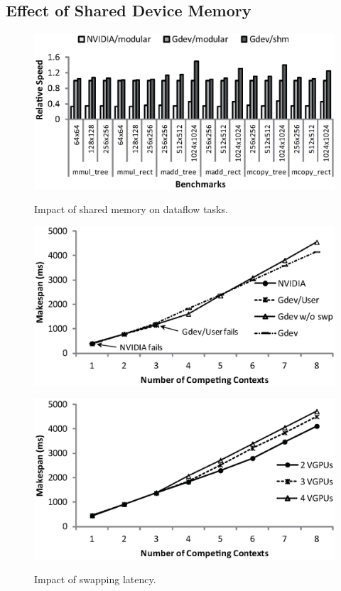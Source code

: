 \vspace{-0.25em}
\subsection{Effect of Shared Device Memory}
\vspace{-0.25em}

\begin{figure}[t]
 \begin{center}
  \includegraphics[width=\hsize]{eps/dataflow.eps}\\
  \vspace{-1.5em}
  \caption{Impact of shared memory on dataflow tasks.}
  \label{fig:dataflow}
 \end{center}
 \vspace{-1.5em}
 \begin{center}
  \includegraphics[width=0.75\hsize]{eps/swapping.eps}\\
  \vspace{-1.5em}
  \caption{Impact of swapping latency.}
  \label{fig:swapping}
 \end{center}
 \vspace{-1.5em}
 \begin{center}
  \includegraphics[width=0.75\hsize]{eps/swapping_vgpu.eps}\\

\end{center}
\end{figure}
